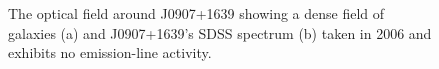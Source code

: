 \begin{figure}[h]
    \centering
    \qquad
    \caption{The optical field around J0907+1639 showing a dense field of galaxies (a) and J0907+1639's SDSS spectrum (b) taken in 2006 and exhibits no emission-line activity. }%
    \label{fig:example}%
\end{figure}



